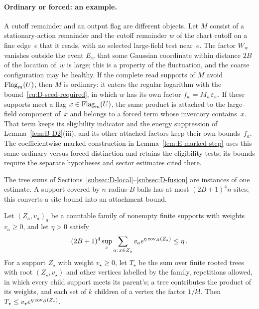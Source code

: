 \paragraph{Ordinary or forced: an example.} A cutoff remainder and an output flag are different objects. Let $M$ consist of a stationary-action remainder and the cutoff remainder $w$ of the chart cutoff on a fine edge~$e$ that it reads, with no selected large-field test near~$e$. The factor $W_w$ vanishes outside the event $E_w$ that some Gaussian coordinate within distance $2B$ of the location of~$w$ is large; this is a property of the fluctuation, and the coarse configuration may be healthy. If the complete read supports of $M$ avoid $\operatorname{Flag}_m(U)$, then $M$ is ordinary: it enters the regular logarithm with the bound~\eqref{eq:D-seed-required}, in which $w$ has its own factor $f_w=M_w\varepsilon_w$. If these supports meet a flag $x\in\operatorname{Flag}_m(U)$, the same product is attached to the large-field component of~$x$ and belongs to a forced term whose inventory contains~$x$. That term keeps its eligibility indicator and the energy suppression of Lemma~\ref{lem:B-D2}(iii), and its other attached factors keep their own bounds~$f_a$. The coefficientwise marked construction in Lemma~\ref{lem:E-marked-step} uses this same ordinary-versus-forced distinction and retains the eligibility tests; its bounds require the separate hypotheses and sector estimates cited there.

The tree sums of Sections~\ref{subsec:D-local}--\ref{subsec:D-fusion} are instances of one estimate. A support covered by $n$ radius-$B$ balls has at most $(2B+1)^4n$ sites; this converts a site bound into an attachment bound.

\begin{lemma}\label{lem:D-rooted}
Let $(Z_a,v_a)_a$ be a countable family of nonempty finite supports with weights $v_a\ge0$, and let $\eta>0$ satisfy
\begin{equation*}
(2B+1)^4\sup_x\sum_{a:\,x\in Z_a}v_ae^{\eta\operatorname{cov}_B(Z_a)}\le\eta\,.
\end{equation*}
For a support $Z_\star$ with weight $v_\star\ge0$, let $T_\star$ be the sum over finite rooted trees with root $(Z_\star,v_\star)$ and other vertices labelled by the family, repetitions allowed, in which every child support meets its parent's; a tree contributes the product of its weights, and each set of $k$ children of a vertex the factor $1/k!$. Then $T_\star\le v_\star e^{\eta\operatorname{cov}_B(Z_\star)}$.
\end{lemma}

